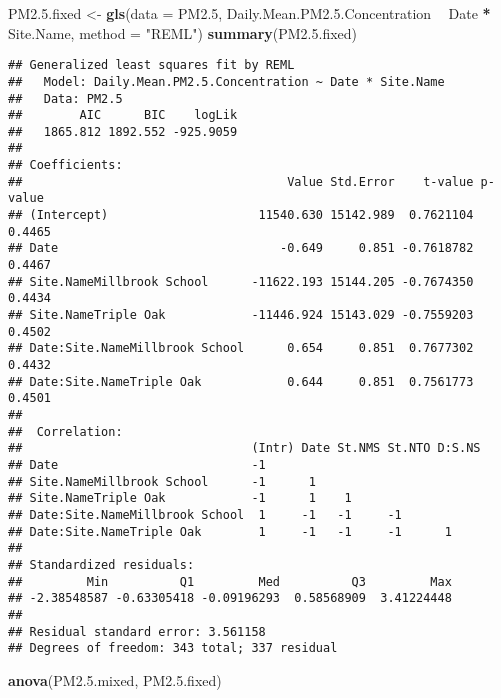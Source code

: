 \documentclass[]{article}
\newenvironment{Shaded}{\begin{snugshade}}{\end{snugshade}}
\newcommand{\KeywordTok}[1]{\textcolor[rgb]{0.13,0.29,0.53}{\textbf{#1}}}
\newcommand{\DataTypeTok}[1]{\textcolor[rgb]{0.13,0.29,0.53}{#1}}
\newcommand{\DecValTok}[1]{\textcolor[rgb]{0.00,0.00,0.81}{#1}}
\newcommand{\FloatTok}[1]{\textcolor[rgb]{0.00,0.00,0.81}{#1}}
\newcommand{\StringTok}[1]{\textcolor[rgb]{0.31,0.60,0.02}{#1}}
\newcommand{\OperatorTok}[1]{\textcolor[rgb]{0.81,0.36,0.00}{\textbf{#1}}}
\newcommand{\NormalTok}[1]{#1}
\begin{document}
\begin{Shaded}
\begin{Highlighting}[]
\NormalTok{PM2.}\FloatTok{5.}\NormalTok{fixed <-}\StringTok{ }\KeywordTok{gls}\NormalTok{(}\DataTypeTok{data =}\NormalTok{ PM2.}\DecValTok{5}\NormalTok{,}
\NormalTok{                   Daily.Mean.PM2.}\FloatTok{5.}\NormalTok{Concentration }\OperatorTok{~}\StringTok{ }\NormalTok{Date }\OperatorTok{*}\StringTok{ }\NormalTok{Site.Name,}
                   \DataTypeTok{method =} \StringTok{"REML"}\NormalTok{)}
\KeywordTok{summary}\NormalTok{(PM2.}\FloatTok{5.}\NormalTok{fixed)}
\end{Highlighting}
\end{Shaded}

\begin{verbatim}
## Generalized least squares fit by REML
##   Model: Daily.Mean.PM2.5.Concentration ~ Date * Site.Name 
##   Data: PM2.5 
##        AIC      BIC    logLik
##   1865.812 1892.552 -925.9059
## 
## Coefficients:
##                                     Value Std.Error    t-value p-value
## (Intercept)                     11540.630 15142.989  0.7621104  0.4465
## Date                               -0.649     0.851 -0.7618782  0.4467
## Site.NameMillbrook School      -11622.193 15144.205 -0.7674350  0.4434
## Site.NameTriple Oak            -11446.924 15143.029 -0.7559203  0.4502
## Date:Site.NameMillbrook School      0.654     0.851  0.7677302  0.4432
## Date:Site.NameTriple Oak            0.644     0.851  0.7561773  0.4501
## 
##  Correlation: 
##                                (Intr) Date St.NMS St.NTO D:S.NS
## Date                           -1                              
## Site.NameMillbrook School      -1      1                       
## Site.NameTriple Oak            -1      1    1                  
## Date:Site.NameMillbrook School  1     -1   -1     -1           
## Date:Site.NameTriple Oak        1     -1   -1     -1      1    
## 
## Standardized residuals:
##         Min          Q1         Med          Q3         Max 
## -2.38548587 -0.63305418 -0.09196293  0.58568909  3.41224448 
## 
## Residual standard error: 3.561158 
## Degrees of freedom: 343 total; 337 residual
\end{verbatim}

\begin{Shaded}
\begin{Highlighting}[]
\KeywordTok{anova}\NormalTok{(PM2.}\FloatTok{5.}\NormalTok{mixed, PM2.}\FloatTok{5.}\NormalTok{fixed)}
\end{Highlighting}
\end{Shaded}
\end{document}
